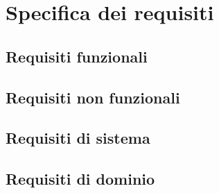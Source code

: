 \chapter{Specifica dei requisiti}
\section{Requisiti funzionali}

\newpage

\section{Requisiti non funzionali}

\section{Requisiti di sistema}
\section{Requisiti di dominio}